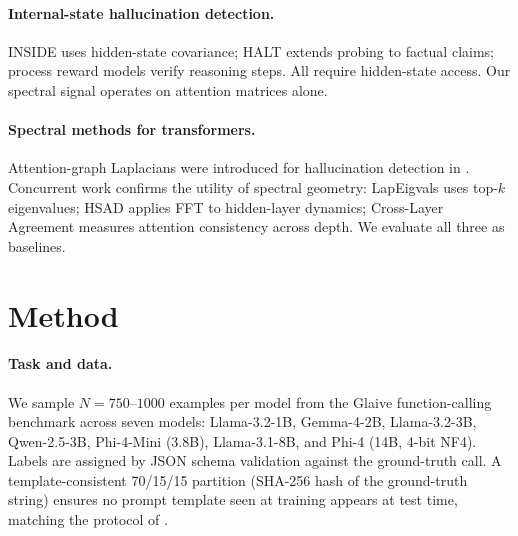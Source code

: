 \documentclass{article}
\begin{document}
\paragraph{Internal-state hallucination detection.}
INSIDE \cite{chen2024inside} uses hidden-state covariance; HALT
\cite{bhatnagar2026halt} extends probing to factual claims; process
reward models \cite{lightman2023lets} verify reasoning steps.  All
require hidden-state access.  Our spectral signal operates on attention
matrices alone.

\paragraph{Spectral methods for transformers.}
Attention-graph Laplacians were introduced for hallucination detection
in \cite{noel2025gsp}.  Concurrent work confirms the utility of
spectral geometry: LapEigvals \cite{binkowski2025hallucination} uses
top-$k$ eigenvalues; HSAD \cite{li2025llm} applies FFT to hidden-layer
dynamics; Cross-Layer Agreement \cite{badash2026between} measures
attention consistency across depth.  We evaluate all three as baselines.


\section{Method}
\label{sec:method}

\paragraph{Task and data.}
We sample $N{=}750$--$1000$ examples per model from the Glaive
function-calling benchmark \cite{glaive2024function} across seven
models: Llama-3.2-1B, Gemma-4-2B, Llama-3.2-3B, Qwen-2.5-3B,
Phi-4-Mini (3.8B), Llama-3.1-8B, and Phi-4 (14B, 4-bit NF4).  Labels
are assigned by JSON schema validation against the ground-truth call.  A
template-consistent 70/15/15 partition (SHA-256 hash of the ground-truth
string) ensures no prompt template seen at training appears at test
time, matching the protocol of \cite{healy2026internal}.
\end{document}

